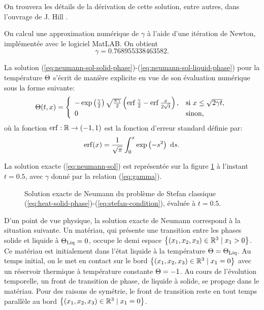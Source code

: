 On trouvera les détails de la dérivation de cette solution, entre
autres, dans l'ouvrage de J. Hill \cite{HillStefanProblems}.

On calcul une approximation numérique de $\gamma$ à l'aide d'une
itération de Newton, implémentée avec le logiciel MatLAB. On obtient
\begin{equation}\label{eq:gamma}
  \gamma =\num{0.768955338463582}.
\end{equation}

La solution
(\ref{eq:neumann-sol-solid-phase})-(\ref{eq:neumann-sol-liquid-phase})
pour la température $\Theta$ s'écrit de manière explicite
en vue de son évaluation numérique sous la forme suivante:
\begin{equation}\label{eq:neumann-sol}
  \temperature(t, x) = \left\{
  \begin{array}{ll}
    -\exp\parent{\frac{\gamma}{2}}\sqrt{\frac{\pi\gamma}{2}} %
    \parent{\erf{\frac{\gamma}{2}} - \erf{\frac{x}{2\sqrt{t}}}}, %
    & \text{si } x \leq \sqrt{2\gamma t},\\
    0 %
    & \text{sinon,}
  \end{array}
  \right.
\end{equation}
où la fonction $\operatorname{erf}:\mathbb R\to(-1,1)$ est la fonction d'erreur
standard définie par:
\begin{equation}
  \operatorname{erf}(x) = \frac{1}{\sqrt \pi}\int_0^x \exp\left( -s^2 \right)\,\,\mathrm ds.
\end{equation}

La solution exacte (\ref{eq:neumann-sol}) est représentée sur la
figure \ref{fig:neumann-sol} à l'instant $t = 0.5$, avec $\gamma$
donné par la relation (\ref{eq:gamma}).

\begin{figure}
  \begin{center}
    
    \caption{Solution exacte de Neumann du problème de Stefan classique
      (\ref{eq:heat-solid-phase})-(\ref{eq:stefan-condition}), évaluée
      à $t = 0.5$.}
    \label{fig:neumann-sol}
  \end{center}
\end{figure}

D'un point de vue physique, la solution exacte de Neumann correspond à
la situation suivante. Un matériau, qui présente une transition entre
les phases solide et liquide à $\Theta_\text{Liq} = 0$, occupe le demi espace
$\left\{ (x_1, x_2, x_3)\in \mathbb R^3 \mid x_1 > 0 \right\}$. Ce matériau
est initialement dans l'état liquide à la température $\Theta =
\Theta_\text{Liq}$. Au temps initial, on le met en contact sur le bord
$\left\{ (x_1, x_2, x_3)\in\mathbb R^3 \mid x_1 = 0 \right\}$ avec un
réservoir thermique à température constante $\Theta = -1$. Au
cours de l'évolution temporelle, un front de transition de phase, de
liquide à solide, se propage dans le matériau. Pour des raisons de
symétrie, le front de transition reste en tout temps parallèle au
bord $\left\{ (x_1, x_2, x_3)\in\mathbb R^3 \mid x_1 = 0 \right\}$.

